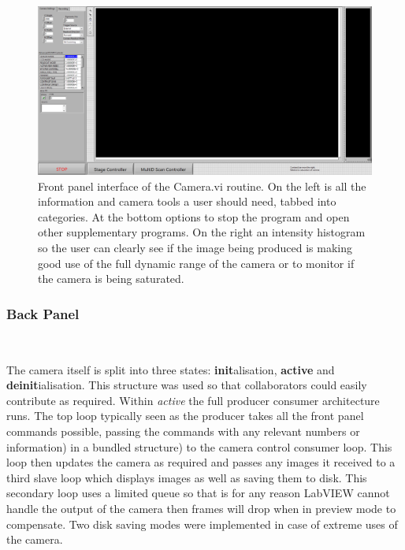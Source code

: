 \begin{figure}
\centering
\includegraphics[width=\linewidth]{Figures/camera_frontpanel}
\caption[Front Panel of Camera.vi]{Front panel interface of the Camera.vi routine.
On the left is all the information and camera tools a user should need, tabbed into categories.
At the bottom options to stop the program and open other supplementary programs.
On the right an intensity histogram so the user can clearly see if the image being produced is making good use of the full dynamic range of the camera or to monitor if the camera is being saturated.}
\label{fig:camera_frontpanel}
\end{figure}

\subsubsection{Back Panel}~

The camera itself is split into three states: \textbf{init}alisation, \textbf{active} and \textbf{deinit}ialisation.
This structure was used so that collaborators could easily contribute as required.
Within \textit{active} the full producer consumer architecture runs.
The top loop typically seen as the producer takes all the front panel commands possible, passing the commands with any relevant numbers or information) in a bundled structure) to the camera control consumer loop.
This loop then updates the camera as required and passes any images it received to a third slave loop which displays images as well as saving them to disk.
This secondary loop uses a limited queue so that is for any reason LabVIEW cannot handle the output of the camera then frames will drop when in preview mode to compensate.
Two disk saving modes were implemented in case of extreme uses of the camera.

